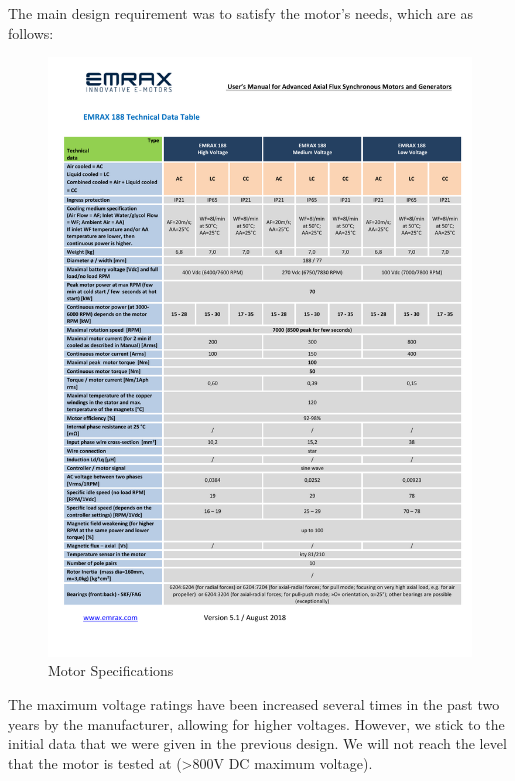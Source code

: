 The main design requirement was to satisfy the motor's needs, which are as follows:
\begin{figure}[H]
    \centering
    \includegraphics[page=2,width=\textwidth]{texfiles/mech/eimg/propulsion/table_motor}
    \caption{Motor Specifications}
    \label{fig: Motor Specifications}
\end{figure}
The maximum voltage ratings have been increased several times in the past two years by the manufacturer, allowing for higher voltages. However, we stick to the initial data that we were given in the previous design. We will not reach the level that the motor is tested at (>800V DC maximum voltage). \\

